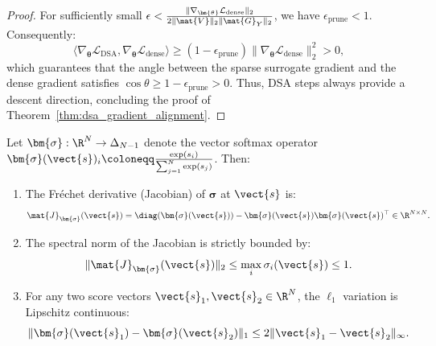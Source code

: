 \begin{proof}
For sufficiently small $\epsilon < \frac{\|\nabla_{\bm{\theta}} \mathcal{L}_{\text{dense}}\|_2}{2 \|\mat{V}\|_2 \|\mat{G}_Y\|_2}$, we have $\epsilon_{\text{prune}} < 1$.
Consequently:
\begin{equation}
\langle \nabla_{\bm{\theta}} \mathcal{L}_{\text{DSA}}, \nabla_{\bm{\theta}} \mathcal{L}_{\text{dense}} \rangle \ge (1 - \epsilon_{\text{prune}}) \|\nabla_{\bm{\theta}} \mathcal{L}_{\text{dense}}\|_2^2 > 0,
\end{equation}
which guarantees that the angle between the sparse surrogate gradient and the dense gradient satisfies $\cos \theta \ge 1 - \epsilon_{\text{prune}} > 0$.
Thus, DSA steps always provide a descent direction, concluding the proof of Theorem~\ref{thm:dsa_gradient_alignment}.
\end{proof}

\begin{lemma}
\label{lem:softmax_frechet_lipschitz}
Let $\bm{\sigma}: \R^N \to \Delta_{N-1}$ denote the vector softmax operator $\bm{\sigma}(\vect{s})_i \coloneqq \frac{\exp(s_i)}{\sum_{j=1}^N \exp(s_j)}$.
Then:
\begin{enumerate}
    \item The Fr\'echet derivative (Jacobian) of $\bm{\sigma}$ at $\vect{s}$ is:
    \begin{equation}
    \mat{J}_{\bm{\sigma}}(\vect{s}) = \diag(\bm{\sigma}(\vect{s})) - \bm{\sigma}(\vect{s}) \bm{\sigma}(\vect{s})^\top \in \R^{N \times N}.
    \label{eq:softmax_jacobian_prelim}
    \end{equation}
    \item The spectral norm of the Jacobian is strictly bounded by:
    \begin{equation}
    \|\mat{J}_{\bm{\sigma}}(\vect{s})\|_2 \le \max_{i} \sigma_i(\vect{s}) \le 1.
    \label{eq:softmax_jacobian_spectral_bound}
    \end{equation}
    \item For any two score vectors $\vect{s}_1, \vect{s}_2 \in \R^N$, the $\ell_1$ variation is Lipschitz continuous:
    \begin{equation}
    \|\bm{\sigma}(\vect{s}_1) - \bm{\sigma}(\vect{s}_2)\|_1 \le 2 \|\vect{s}_1 - \vect{s}_2\|_\infty.
    \label{eq:softmax_linfty_l1_lipschitz}
    \end{equation}
\end{enumerate}
\end{lemma}

